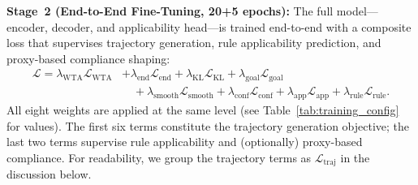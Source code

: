 \noindent\textbf{Stage~2 (End-to-End Fine-Tuning, 20+5 epochs):}  The full model---encoder, decoder, and applicability head---is trained end-to-end with a composite loss that supervises trajectory generation, rule applicability prediction, and proxy-based compliance shaping:
\begin{align}
\mathcal{L}=
\lambda_{\text{WTA}}\mathcal{L}_{\text{WTA}}&+
\lambda_{\text{end}}\mathcal{L}_{\text{end}}+
\lambda_{\text{KL}}\mathcal{L}_{\text{KL}}+
\lambda_{\text{goal}}\mathcal{L}_{\text{goal}}\nonumber\\
&\quad+\lambda_{\text{smooth}}\mathcal{L}_{\text{smooth}}+
\lambda_{\text{conf}}\mathcal{L}_{\text{conf}}+
\lambda_{\text{app}}\mathcal{L}_{\text{app}}+
\lambda_{\text{rule}}\mathcal{L}_{\text{rule}}.
\end{align}
All eight weights are applied at the same level (see Table~\ref{tab:training_config} for values).  The first six terms constitute the trajectory generation objective; the last two terms supervise rule applicability and (optionally) proxy-based compliance. For readability, we group the trajectory terms as $\mathcal{L}_{\text{traj}}$ in the discussion below.

